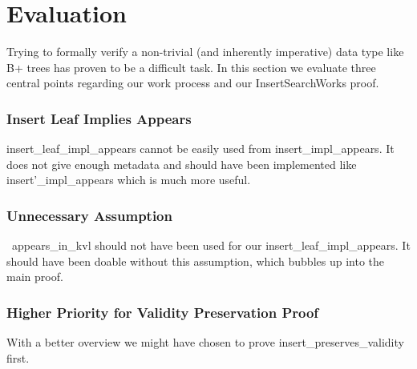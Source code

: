 \section{Evaluation}
\label{sec:Evaluation}
Trying to formally verify a non-trivial (and inherently imperative) data type like B+ trees has proven to be a difficult task. In this section we evaluate three central points regarding our work process and our InsertSearchWorks proof.
\subsubsection{Insert Leaf Implies Appears}
insert_leaf_impl_appears cannot be easily used from insert_impl_appears. It does not give enough metadata and should have been implemented like insert'_impl_appears which is much more useful. 
\subsubsection{Unnecessary Assumption}
~appears_in_kvl should not have been used for our insert_leaf_impl_appears. It should have been doable without this assumption, which bubbles up into the main proof.
\subsubsection{Higher Priority for Validity Preservation Proof}
With a better overview we might have chosen to prove insert_preserves_validity first.

